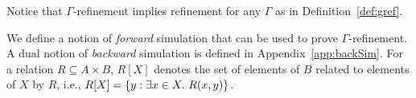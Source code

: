 Notice that $\Gamma$-refinement implies refinement for any $\Gamma$ as in Definition~\ref{def:gref}.

We define a notion of \emph{forward} simulation that can be used to prove $\Gamma$-refinement. 
A dual notion of \emph{backward} simulation is defined in Appendix~\ref{app:backSim}. 
For a relation $R\subseteq A\times B$, $R[X]$ denotes the set of elements of $B$ related to elements of $X$ by $R$, i.e., $R[X]=\set{y:\exists x\in X.\ R(x,y)}$.



